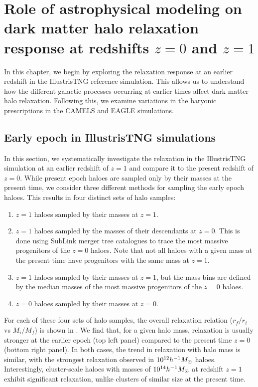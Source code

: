 \chapter{Role of astrophysical modeling on dark matter halo relaxation response at redshifts $z=0$ and $z=1$}
\label{chap:physvar_z01}

In this chapter, we begin by exploring the relaxation response at an earlier redshift in the IllustrisTNG reference simulation. This allows us to understand how the different galactic processes occurring at earlier times affect dark matter halo relaxation. Following this, we examine variations in the baryonic prescriptions in the CAMELS and EAGLE simulations.

\section{Early epoch in IllustrisTNG simulations}
\label{sec:res-itng-z01}
In this section, we systematically investigate the relaxation in the IllustrisTNG simulation at an earlier redshift of $z = 1$ and compare it to the present redshift of $z = 0$. While present epoch haloes are sampled only by their masses at the present time, we consider three different methods for sampling the early epoch haloes. This results in four distinct sets of halo samples:

\begin{enumerate}
\item $z=1$ haloes sampled by their masses at $z=1$.
\item $z=1$ haloes sampled by the masses of their descendants at $z=0$. This is done using SubLink merger tree catalogues to trace the most massive progenitors of the $z=0$ haloes. Note that not all haloes with a given mass at the present time have progenitors with the same mass at $z=1$.
\item $z=1$ haloes sampled by their masses at $z=1$, but the mass bins are defined by the median masses of the most massive progenitors of the $z=0$ haloes.
\item $z=0$ haloes sampled by their masses at $z=0$.
\end{enumerate}

For each of these four sets of halo samples, the overall relaxation relation ($r_f/r_i$ vs $M_i/M_f$) is shown in . We find that, for a given halo mass, relaxation is usually stronger at the earlier epoch (top left panel) compared to the present time $z=0$ (bottom right panel). In both cases, the trend in relaxation with halo mass is similar, with the strongest relaxation observed in $10^{12} h^{-1}M_{\odot}$ haloes. Interestingly, cluster-scale haloes with masses of $10^{14} h^{-1}M_{\odot}$ at redshift $z=1$ exhibit significant relaxation, unlike clusters of similar size at the present time.

